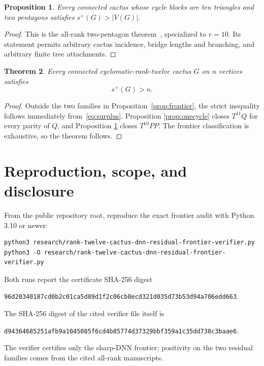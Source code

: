 \documentclass[11pt]{article}
\newtheorem{theorem}{Theorem}[section]
\newtheorem{proposition}[theorem]{Proposition}
\newcommand{\splus}{s^+}
\begin{document}
\begin{proposition}\label{prop:twopent}
Every connected cactus whose cycle blocks are ten triangles and two pentagons
satisfies $\splus(G)>|V(G)|$.
\end{proposition}

\begin{proof}
This is the all-rank two-pentagon theorem~\cite{TwoPent}, specialized to
$r=10$.  Its statement permits arbitrary cactus incidence, bridge lengths and
branching, and arbitrary finite tree attachments.
\end{proof}

\begin{theorem}\label{thm:main}
Every connected cyclomatic-rank-twelve cactus $G$ on $n$ vertices satisfies
\[
 \boxed{\splus(G)>n}.
\]
\end{theorem}

\begin{proof}
Outside the two families in Proposition~\ref{prop:frontier}, the strict
inequality follows immediately from~\eqref{eq:surplus}.  Proposition
\ref{prop:onecycle} closes $T^{11}Q$ for every parity of $Q$, and Proposition
\ref{prop:twopent} closes $T^{10}PP$.  The frontier classification is
exhaustive, so the theorem follows.
\end{proof}

\section{Reproduction, scope, and disclosure}

From the public repository root, reproduce the exact frontier audit with
Python 3.10 or newer:
\begin{verbatim}
python3 research/rank-twelve-cactus-dnn-residual-frontier-verifier.py
python3 -O research/rank-twelve-cactus-dnn-residual-frontier-verifier.py
\end{verbatim}
Both runs report the certificate SHA-256 digest
\begin{center}
\texttt{96d20340187cd0b2c01ca5d89d1f2c06cb0ecd321d035d73b53d94a706edd663}.
\end{center}
The SHA-256 digest of the cited verifier file itself is
\begin{center}
\texttt{d94364685251afb9a1045085f6cd4b85774d37329bbf359a1c35dd738c3baae6}.
\end{center}
The verifier certifies only the sharp-DNN frontier; positivity on the two
residual families comes from the cited all-rank manuscripts.
\end{document}

